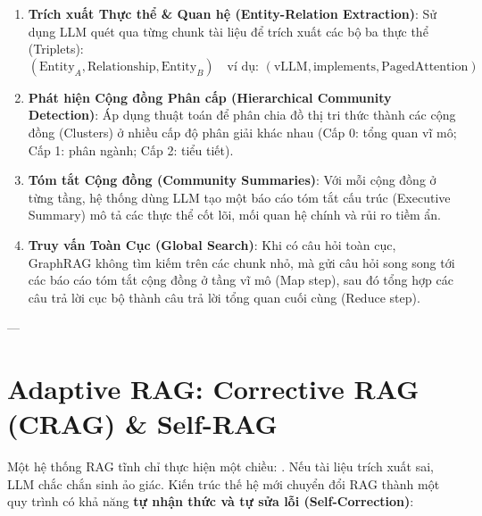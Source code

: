 \begin{enumerate}
  \item \textbf{Trích xuất Thực thể \& Quan hệ (Entity-Relation Extraction)}:
  Sử dụng LLM quét qua từng chunk tài liệu để trích xuất các bộ ba thực thể (Triplets):
  \begin{equation}
  (\text{Entity}_A, \text{Relationship}, \text{Entity}_B) \quad \text{ví dụ: } (\text{vLLM}, \text{implements}, \text{PagedAttention})
  \end{equation}
  \item \textbf{Phát hiện Cộng đồng Phân cấp (Hierarchical Community Detection)}:
  Áp dụng thuật toán  để phân chia đồ thị tri thức thành các cộng đồng (Clusters) ở nhiều cấp độ phân giải khác nhau (Cấp 0: tổng quan vĩ mô; Cấp 1: phân ngành; Cấp 2: tiểu tiết).
  \item \textbf{Tóm tắt Cộng đồng (Community Summaries)}:
  Với mỗi cộng đồng ở từng tầng, hệ thống dùng LLM tạo một báo cáo tóm tắt cấu trúc (Executive Summary) mô tả các thực thể cốt lõi, mối quan hệ chính và rủi ro tiềm ẩn.
  \item \textbf{Truy vấn Toàn Cục (Global Search)}:
  Khi có câu hỏi toàn cục, GraphRAG không tìm kiếm trên các chunk nhỏ, mà gửi câu hỏi song song tới các báo cáo tóm tắt cộng đồng ở tầng vĩ mô (Map step), sau đó tổng hợp các câu trả lời cục bộ thành câu trả lời tổng quan cuối cùng (Reduce step).
\end{enumerate}

---

\section{Adaptive RAG: Corrective RAG (CRAG) \& Self-RAG}
\label{sec:adaptive-rag}

Một hệ thống RAG tĩnh chỉ thực hiện một chiều: . Nếu tài liệu trích xuất sai, LLM chắc chắn sinh ảo giác.
Kiến trúc thế hệ mới chuyển đổi RAG thành một quy trình có khả năng \textbf{tự nhận thức và tự sửa lỗi (Self-Correction)}:

